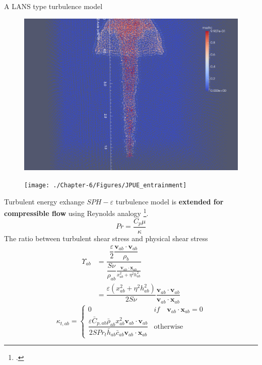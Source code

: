 \documentclass{beamer}
\begin{document}
\begin{frame}{A LANS type turbulence model}
\begin{minipage}{0.34 \textwidth}
\begin{figure}
\includegraphics[width=0.80 \textwidth]{./PPT/No_turb}
\end{figure}
%
\begin{figure}
\texttt{[image: ./Chapter-6/Figures/JPUE\_entrainment]}
\end{figure}
\end{minipage}
\end{frame}

\begin{frame}{Turbulent energy exhange}
$SPH-\varepsilon$ turbulence model is {\bf extended for compressible flow} using Reynolds analogy \footcite{gmd-2017-119}.
\begin{equation}
Pr=\dfrac{C_p \mu}{\kappa}
\end{equation}
The ratio between turbulent shear stress and physical shear stress %
\begin{equation}
\begin{split}
\Upsilon_{ab} &= \dfrac{\dfrac{\varepsilon}{2} \dfrac{\textbf{v}_{ab} \cdot \textbf{v}_{ab}}{\rho_b}}{\dfrac{S \nu}{\rho_{ab}} \frac{\textbf{v}_{ab} \cdot \textbf{x}_{ab}}{x_{ab}^2 + \eta^2 h_{ab}^2}} \\
 & = \dfrac{\varepsilon \left(x_{ab}^2 + \eta^2 h_{ab}^2\right)}{2 S \nu} \dfrac{\textbf{v}_{ab} \cdot \textbf{v}_{ab}}{\textbf{v}_{ab} \cdot \textbf{x}_{ab}}
\end{split}
\end{equation}
\begin{equation}
\kappa_{t,ab}= 
\begin{cases} 
      0 & if \quad \textbf{v}_{ab} \cdot \textbf{x}_{ab} = 0 \\
      \dfrac{\varepsilon \bar{C}_{p,ab} \bar{\rho}_{ab} x_{ab}^2 \textbf{v}_{ab} \cdot \textbf{v}_{ab}}{2 S Pr_t \bar{h}_{ab} \bar{c}_{ab} \textbf{v}_{ab} \cdot \textbf{x}_{ab} } & \text{otherwise}
\end{cases}
\label{eq:SPH-LANS-heat-conductivity}
\end{equation}
\end{frame}
\end{document}
